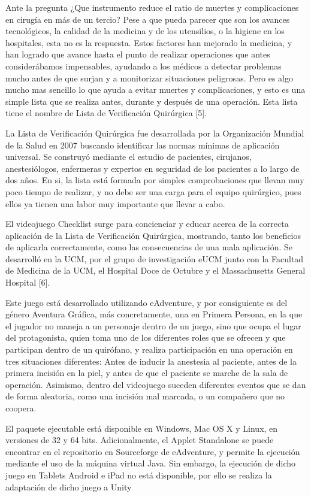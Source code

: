 Ante la pregunta ¿Que instrumento reduce el ratio de muertes y complicaciones en cirugía en más de un tercio? Pese a que pueda parecer que son los avances tecnológicos, la calidad de la medicina y de los utensilios, o la higiene en los hospitales, esta no es la respuesta. Estos factores han mejorado la medicina, y han logrado que avance hasta el punto de realizar operaciones que antes considerábamos impensables, ayudando a los médicos a detectar problemas mucho antes de que surjan y a monitorizar situaciones peligrosas. Pero es algo mucho mas sencillo lo que ayuda a evitar muertes y complicaciones, y esto es una simple lista que se realiza antes, durante y después de una operación. Esta lista tiene el nombre de Lista de Verificación Quirúrgica [5].

La Lista de Verificación Quirúrgica fue desarrollada por la Organización Mundial de la Salud en 2007 buscando identificar las normas mínimas de aplicación universal. Se construyó mediante el estudio de pacientes, cirujanos, anestesiólogos, enfermeras y expertos en seguridad de los pacientes a lo largo de dos años. En si, la lista está formada por simples comprobaciones que llevan muy poco tiempo de realizar, y no debe ser una carga para el equipo quirúrgico, pues ellos ya tienen una labor muy importante que llevar a cabo.

El videojuego Checklist surge para concienciar y educar acerca de la correcta aplicación de la Lista de Verificación Quirúrgica, mostrando, tanto los beneficios de aplicarla correctamente, como las consecuencias de una mala aplicación. Se desarrolló en la UCM, por el grupo de investigación eUCM junto con la Facultad de Medicina de la UCM, el Hospital Doce de Octubre y el Massachusetts General Hospital [6].

Este juego está desarrollado utilizando eAdventure, y por consiguiente es del género Aventura Gráfica, más concretamente, una en Primera Persona, en la que el jugador no maneja a un personaje dentro de un juego, sino que ocupa el lugar del protagonista, quien toma uno de los diferentes roles que se ofrecen y que participan dentro de un quirófano, y realiza participación en una operación en tres situaciones diferentes: Antes de inducir la anestesia al paciente, antes de la primera incisión en la piel, y antes de que el paciente se marche de la sala de operación. Asimismo, dentro del videojuego suceden diferentes eventos que se dan de forma aleatoria, como una incisión mal marcada, o un compañero que no coopera.

El paquete ejecutable está disponible en Windows, Mac OS X y Linux, en versiones de 32 y 64 bits. Adicionalmente, el Applet Standalone se puede encontrar en el repositorio en Sourceforge de eAdventure, y permite la ejecución mediante el uso de la máquina virtual Java. Sin embargo, la ejecución de dicho juego en Tablets Android e iPad no está disponible, por ello se realiza la adaptación de dicho juego a Unity 

